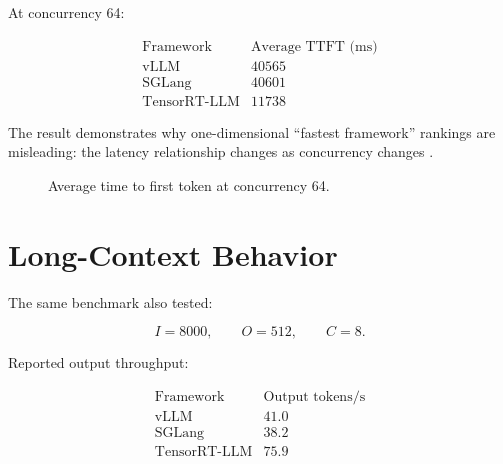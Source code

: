 \documentclass[11pt,a4paper]{article}
\begin{document}
At concurrency 64:

\[
\begin{array}{l|r}
\text{Framework} & \text{Average TTFT (ms)}\\
\hline
\text{vLLM} & 40565\\
\text{SGLang} & 40601\\
\text{TensorRT-LLM} & 11738
\end{array}
\]

The result demonstrates why one-dimensional ``fastest framework''
rankings are misleading: the latency relationship changes as
concurrency changes \cite{benchmark2026}.

\begin{figure}[H]
\centering


\caption{Average time to first token at concurrency 64.}
\end{figure}

\section{Long-Context Behavior}

The same benchmark also tested:

\[
I=8000,\qquad O=512,\qquad C=8.
\]

Reported output throughput:

\[
\begin{array}{l|r}
\text{Framework} & \text{Output tokens/s}\\
\hline
\text{vLLM} & 41.0\\
\text{SGLang} & 38.2\\
\text{TensorRT-LLM} & 75.9
\end{array}
\]
\end{document}
